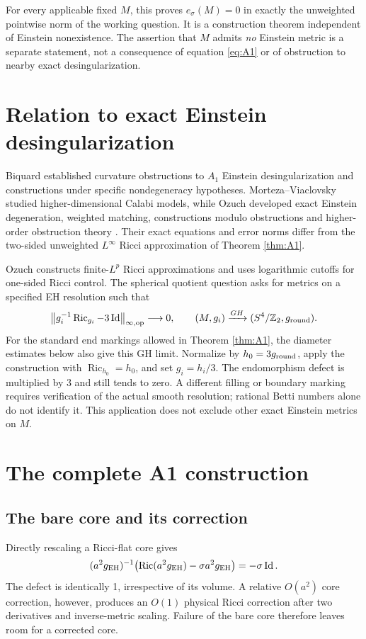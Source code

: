 \documentclass[a4paper,11pt]{article}
\numberwithin{equation}{section}
\theoremstyle{definition}
\newcommand{\Ric}{\operatorname{Ric}}
\newcommand{\Id}{\operatorname{Id}}
\newcommand{\op}{\mathrm{op}}
\newcommand{\Z}{\mathbb Z}
\newcommand{\norm}[1]{\left\lVert#1\right\rVert}
\begin{document}
For every applicable fixed $M$, this proves $e_\sigma(M)=0$ in exactly the unweighted pointwise norm of the working question. It is a construction theorem independent of Einstein nonexistence. The assertion that $M$ admits \emph{no} Einstein metric is a separate statement, not a consequence of equation \eqref{eq:A1} or of obstruction to nearby exact desingularization.

\section{Relation to exact Einstein desingularization}
Biquard established curvature obstructions to $A_1$ Einstein desingularization and constructions under specific nondegeneracy hypotheses. Morteza--Viaclovsky studied higher-dimensional Calabi models, while Ozuch developed exact Einstein degeneration, weighted matching, constructions modulo obstructions and higher-order obstruction theory \cite{Biquard,MV,OzuchI,OzuchII,OzuchHigher,OzuchIntegrability}. Their exact equations and error norms differ from the two-sided unweighted $L^\infty$ Ricci approximation of Theorem \ref{thm:A1}.

Ozuch \cite[\S7.3]{OzuchII} constructs finite-$L^p$ Ricci approximations and uses logarithmic cutoffs for one-sided Ricci control. The spherical quotient question asks for metrics on a specified EH resolution such that
\begin{equation}\label{eq:football}
\norm{g_i^{-1}\Ric_{g_i}-3\Id}_{\infty,\op}\longrightarrow0,
\qquad (M,g_i)\xrightarrow{GH}(S^4/\Z_2,g_{\rm round}).
\end{equation}
For the standard end markings allowed in Theorem \ref{thm:A1}, the diameter estimates below also give this GH limit. Normalize by $h_0=3g_{\rm round}$, apply the construction with $\Ric_{h_0}=h_0$, and set $g_i=h_i/3$. The endomorphism defect is multiplied by 3 and still tends to zero. A different filling or boundary marking requires verification of the actual smooth resolution; rational Betti numbers alone do not identify it. This application does not exclude other exact Einstein metrics on $M$.

\section{The complete A1 construction}\label{sec:A1-proof}
\subsection{The bare core and its correction}
Directly rescaling a Ricci-flat core gives
\[
(a^2g_{\rm EH})^{-1}\bigl(\Ric(a^2g_{\rm EH})-\sigma a^2g_{\rm EH}\bigr)=-\sigma\Id.
\]
The defect is identically 1, irrespective of its volume. A relative $O(a^2)$ core correction, however, produces an $O(1)$ physical Ricci correction after two derivatives and inverse-metric scaling. Failure of the bare core therefore leaves room for a corrected core.
\end{document}
